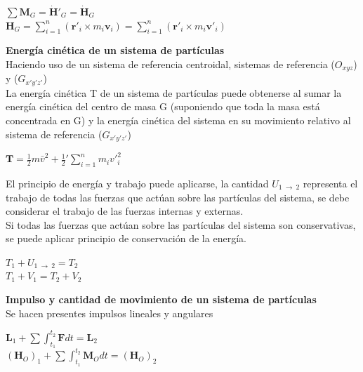 \documentclass[11pt,a4paper,twocolumn]{article}
\newcommand{\vc}[1]{\textbf{#1}}
\begin{document}
	\begin{tcolorbox}
		\begin{center}
			$ \sum \vc{M}_{G}=\dot{\vc{H}}'_{G} = \dot{\vc{H}}_{G}$\\
			$\vc{H}_{G}=\sum_{i=1}^{n}(\vc{r}'_{i}\times m_{i}\vc{v}_{i})=\sum_{i=1}^{n}(\vc{r}'_{i}\times m_{i}\vc{v}'_{i})$
		\end{center}
	\end{tcolorbox}

	\textbf{Energía cinética de un sistema de partículas}\\
	Haciendo uso de un sistema de referencia centroidal, sistemas de referencia ($O_{xyz}$) y ($G_{x'y'z'}$)\\
	La energía cinética T de un sistema de partículas puede obtenerse al sumar la energía cinética del centro de masa G (suponiendo que toda la masa está concentrada en G) y la energía cinética del sistema en su movimiento relativo al sistema de referencia ($G_{x'y'z'}$)
	\begin{tcolorbox}
		\begin{center}
			$\vc{T}=\frac{1}{2} m \bar{v}^{2} +\frac{1}{2}'\sum_{i=1}^{n}m_{i} v'^{2}_{i}$\\
		\end{center}
	\end{tcolorbox}	
	
	El principio de energía y trabajo puede aplicarse, la cantidad $U_{1~\rightarrow~2}$ representa el trabajo de todas las fuerzas que actúan sobre las partículas del sistema, se debe considerar el trabajo de las fuerzas internas y externas.\\
	Si todas las fuerzas que actúan sobre las partículas del sistema son conservativas, se puede aplicar principio de conservación de la energía.\\
	\begin{tcolorbox}
		\begin{center}
			$T_{1}+U_{1~\rightarrow~2}=T_{2}$\\
			$T_{1}+V_{1}=T_{2}+V_{2}$\\
		\end{center}
	\end{tcolorbox}	
	
	\textbf{Impulso y cantidad de movimiento de un sistema de partículas}\\
	Se hacen presentes impulsos lineales y angulares\\
	\begin{tcolorbox}
		\begin{center}
			$\vc{L}_{1}+\sum \int_{t_{1}}^{t_{2}} \vc{F} dt=\vc{L}_{2}$\\
			$(\vc{H}_{O})_{1}+ \sum \int_{t_{1}}^{t_{2}} \vc{M}_{O} dt=(\vc{H}_{O})_{2} $\\
		\end{center}
	\end{tcolorbox}	
	
\end{document}
